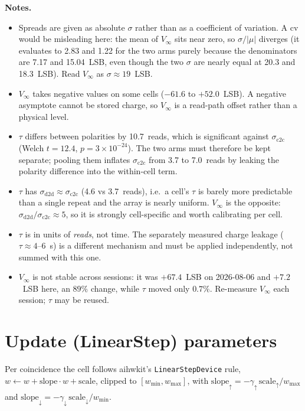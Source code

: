 \documentclass[11pt]{article}
\newcommand{\ctoc}{$\sigma_\mathrm{c2c}$}
\begin{document}
\noindent
\textbf{Notes.}
\begin{itemize}
  \item Spreads are given as absolute $\sigma$ rather than as a coefficient of
        variation. A cv would be misleading here: the mean of $V_\infty$ sits
        near zero, so $\sigma/|\mu|$ diverges (it evaluates to 2.83 and 1.22
        for the two arms purely because the denominators are 7.17 and
        15.04~LSB, even though the two $\sigma$ are nearly equal at 20.3 and
        18.3~LSB). Read $V_\infty$ as $\sigma \approx 19$~LSB.
  \item $V_\infty$ takes negative values on some cells ($-61.6$ to
        $+52.0$~LSB). A negative asymptote cannot be stored charge, so
        $V_\infty$ is a read-path offset rather than a physical level.
  \item $\tau$ differs between polarities by 10.7~reads, which is significant
        against \ctoc{} (Welch $t = 12.4$, $p = 3\times10^{-24}$). The two arms
        must therefore be kept separate; pooling them inflates \ctoc{} from
        3.7 to 7.0~reads by leaking the polarity difference into the
        within-cell term.
  \item $\tau$ has $\sigma_\mathrm{d2d} \approx \sigma_\mathrm{c2c}$
        (4.6 vs 3.7~reads), i.e.\ a cell's $\tau$ is barely more predictable
        than a single repeat and the array is nearly uniform. $V_\infty$ is
        the opposite: $\sigma_\mathrm{d2d}/\sigma_\mathrm{c2c} \approx 5$, so
        it is strongly cell-specific and worth calibrating per cell.
  \item $\tau$ is in units of \emph{reads}, not time. The separately measured
        charge leakage ($\tau \approx 4$--$6$~s) is a different mechanism and
        must be applied independently, not summed with this one.
  \item $V_\infty$ is not stable across sessions: it was $+67.4$~LSB on
        2026-08-06 and $+7.2$~LSB here, an $89\%$ change, while $\tau$ moved
        only $0.7\%$. Re-measure $V_\infty$ each session; $\tau$ may be reused.
\end{itemize}

\section*{Update (LinearStep) parameters}

Per coincidence the cell follows aihwkit's \texttt{LinearStepDevice} rule,
$w \leftarrow w + \mathrm{slope}\cdot w + \mathrm{scale}$, clipped to
$[w_\mathrm{min}, w_\mathrm{max}]$, with
$\mathrm{slope}_\uparrow = -\gamma_\uparrow\,\mathrm{scale}_\uparrow/w_\mathrm{max}$
and
$\mathrm{slope}_\downarrow = -\gamma_\downarrow\,\mathrm{scale}_\downarrow/w_\mathrm{min}$.
\end{document}
